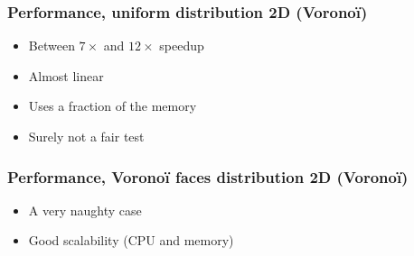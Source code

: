 \documentclass[aspectratio=169]{beamer}
\begin{document}
\begin{frame}
    \frametitle{Performance, uniform distribution 2D (Voronoï)}

    \begin{minipage}[c][0.6\textheight][c]{0.55\textwidth}
        
    \end{minipage}
    \begin{minipage}[c][0.6\textheight][c]{0.4\textwidth}
        \begin{itemize}
            \item Between $7\times$ and $12\times$ speedup

            \bigskip
            \item Almost linear

            \bigskip
            \item Uses a fraction of the memory

            \vfill
            \item Surely not a fair test
        \end{itemize}
    \end{minipage}
\end{frame}


\begin{frame}
    \frametitle{Performance, Voronoï faces distribution 2D (Voronoï)}

    \begin{minipage}[c][0.6\textheight][c]{0.55\textwidth}
        
    \end{minipage}
    \begin{minipage}[c][0.6\textheight][c]{0.4\textwidth}
        \begin{itemize}
            \item A very naughty case

            \bigskip
            \item Good scalability (CPU and memory)
        \end{itemize}
    \end{minipage}
\end{frame}


%         
\end{document}
